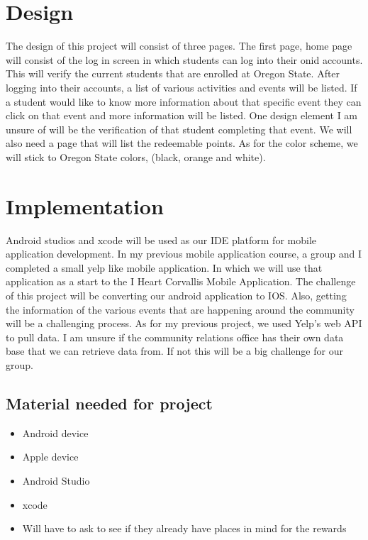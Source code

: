 \documentclass[letterpaper, 10pt, titlepage, fleqn, onecolumn]{article}
\begin{document}
\section{Design}
	The design of this project will consist of three pages. The first page, home page will consist of the log in screen in which students can log into their onid accounts. This will verify the current students that are enrolled at Oregon State. After logging into their accounts, a list of various activities and events will be listed. If a student would like to know more information about that specific event they can click on that event and more information will be listed. One design element I am unsure of will be the verification of that student completing that event. We will also need a page that will list the redeemable points. As for the color scheme, we will stick to Oregon State colors, (black, orange and white).  \\
 
\section{Implementation}
	Android studios and xcode will be used as our IDE platform for mobile application development. In my previous mobile application course, a group and I completed a small yelp like mobile application. In which we will use that application as a start to the I Heart Corvallis Mobile Application. The challenge of this project will be converting our android application to IOS. Also, getting the information of the various events that are happening around the community will be a challenging process. As for my previous project, we used Yelp's web API to pull data. I am unsure if the community relations office has their own data base that we can retrieve data from. If not this will be a big challenge for our group.\\

\subsection{Material needed for project}
\begin{itemize}
\item Android device
\item Apple device 
\item Android Studio
\item xcode
\item Will have to ask to see if they already have places in mind for the rewards 
\end{itemize}
\end{document}
